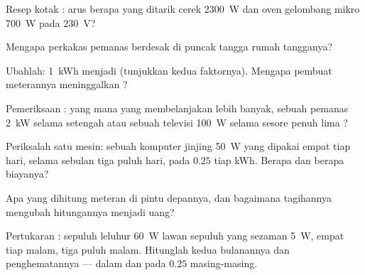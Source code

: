 \begin{exercise}[$\star$]\label{exo:g9:electric-power-energy:3}
Resep kotak : arus berapa yang ditarik cerek \qty{2300}{W}
dan oven gelombang mikro \qty{700}{W} pada \qty{230}{V}?
\end{exercise}

\begin{exercise}[$\star$]\label{exo:g9:electric-power-energy:4}
Mengapa perkakas pemanas berdesak di puncak tangga  rumah
tangganya?
\end{exercise}

\begin{exercise}[$\star$]\label{exo:g9:electric-power-energy:5}
Ubahlah: \qty{1}{kWh} menjadi  (tunjukkan kedua faktornya).
Mengapa pembuat meterannya meninggalkan ?
\end{exercise}

\begin{exercise}[$\star$]\label{exo:g9:electric-power-energy:6}
Pemeriksaan : yang mana yang membelanjakan lebih banyak, sebuah
pemanas \qty{2}{kW} selama setengah  atau sebuah televisi
\qty{100}{W} selama sesore penuh lima ?
\end{exercise}

\begin{exercise}[$\star$]\label{exo:g9:electric-power-energy:7}
Periksalah satu mesin: sebuah komputer jinjing \qty{50}{W} yang
dipakai empat  tiap hari, selama sebulan tiga puluh hari, pada
$0.25$ tiap \unit{kWh}. Berapa  dan berapa biayanya?
\end{exercise}

\begin{exercise}[$\star$]\label{exo:g9:electric-power-energy:8}
Apa yang dihitung meteran di pintu depannya, dan bagaimana tagihannya
mengubah hitungannya menjadi uang?
\end{exercise}

\begin{exercise}[$\star\star$]\label{exo:g9:electric-power-energy:9}
Pertukaran : sepuluh leluhur \qty{60}{W} lawan sepuluh yang
sezaman \qty{5}{W}, empat  tiap malam, tiga puluh malam. Hitunglah
kedua  bulanannya dan penghematannya --- dalam  dan
pada $0.25$ masing-masing.
\end{exercise}

